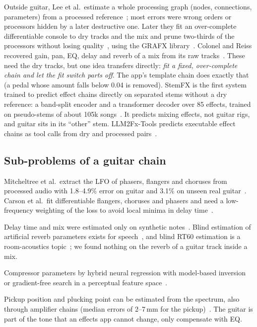 Outside guitar, Lee et al.\ estimate a whole processing graph (nodes,
connections, parameters) from a processed reference~\cite{lee2023blind}; most
errors were wrong orders or processors hidden by a later destructive one. Later
they fit an over-complete differentiable console to dry tracks and the mix and
prune two-thirds of the processors without losing quality~\cite{lee2024searching,lee2025reverse},
using the GRAFX library~\cite{lee2024grafx}. Colonel and Reiss recovered gain,
pan, EQ, delay and reverb of a mix from its raw tracks~\cite{colonel2021reverse}.
These need the dry tracks, but one idea transfers directly: \emph{fit a fixed,
over-complete chain and let the fit switch parts off}. The app's template chain
does exactly that (a pedal whose amount falls below 0.04 is removed).
StemFX is the first system trained to predict effect chains directly on
separated stems without a dry reference: a band-split encoder and a transformer
decoder over 85 effects, trained on pseudo-stems of about 105k
songs~\cite{cheng2026stemfx}. It predicts mixing effects, not guitar rigs, and
guitar sits in its ``other'' stem. LLM2Fx-Tools predicts executable effect chains
as tool calls from dry and processed pairs~\cite{doh2026llm2fxtools}.

\subsection{Sub-problems of a guitar chain}

\begin{description}[style=nextline,leftmargin=1.2cm]
\item[Modulation] Mitcheltree et al.\ extract the LFO of phasers, flangers and
  choruses from processed audio with 1.8--4.9\% error on guitar and 3.1\% on
  unseen real guitar~\cite{mitcheltree2023modulation}. Carson et al.\ fit
  differentiable flangers, choruses and phasers and need a low-frequency
  weighting of the loss to avoid local minima in delay
  time~\cite{carson2026gradient}.
\item[Delay and reverb] Delay time and mix were estimated only on synthetic
  notes~\cite{jurgens2020recognizing,hinrichs2022convolutional}. Blind estimation
  of artificial reverb parameters exists for speech~\cite{lee2022differentiable},
  and blind RT60 estimation is a room-acoustics topic~\cite{gamper2018blind}; we
  found nothing on the reverb of a guitar track inside a mix.
\item[Dynamics] Compressor parameters by hybrid neural regression with
  model-based inversion~\cite{sun2024neural} or gradient-free search in a
  perceptual feature space~\cite{sun2026blackbox}.
\item[The instrument] Pickup position and plucking point can be estimated from
  the spectrum, also through amplifier chains (median errors of 2--7\,mm for the
  pickup)~\cite{mohamad2017pickup,mohamad2017estimating}. The guitar is part of
  the tone that an effects app cannot change, only compensate with EQ.
\end{description}
